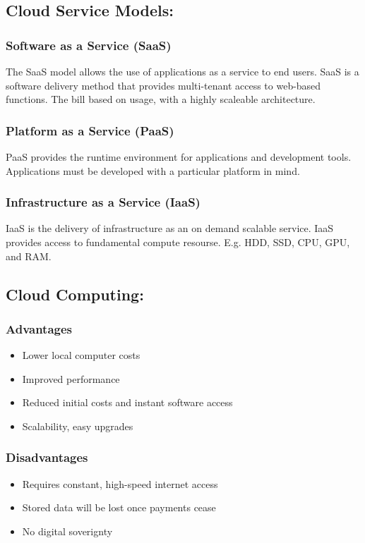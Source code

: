 \documentclass[a5paper]{article}
\begin{document}
	\subsection{Cloud Service Models:}
	\subsubsection{Software as a Service (SaaS)}
	The SaaS model allows the use of applications as a service to end users. SaaS is a software delivery method that provides multi-tenant access to web-based functions. The bill based on usage, with a highly scaleable architecture.
	\subsubsection{Platform as a Service (PaaS)}
	PaaS provides the runtime environment for applications and development tools. Applications must be developed with a particular platform in mind.
	\subsubsection{Infrastructure as a Service (IaaS)}
	IaaS is the delivery of infrastructure as an on demand scalable service. IaaS provides access to fundamental compute resourse. E.g. HDD, SSD, CPU, GPU, and RAM.
	\subsection{Cloud Computing:}
	\subsubsection{Advantages}
	\begin{itemize}
		\item Lower local computer costs
		\item Improved performance
		\item Reduced initial costs and instant software access
		\item Scalability, easy upgrades
	\end{itemize}
	\subsubsection{Disadvantages}
	\begin{itemize}
		\item Requires constant, high-speed internet access
		\item Stored data will be lost once payments cease
		\item No digital soverignty
	\end{itemize}
\end{document}
